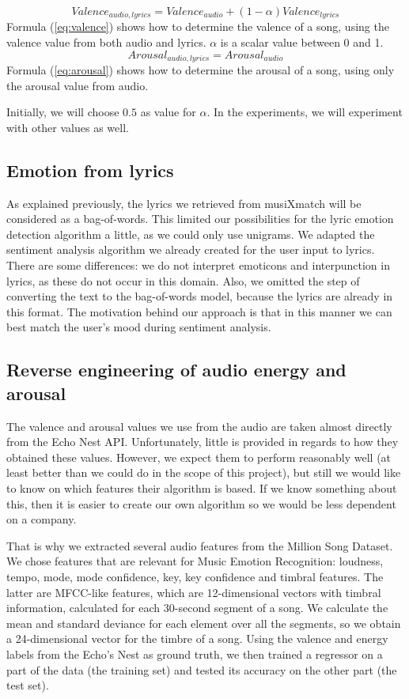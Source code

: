 \documentclass[10pt,journal,compsoc]{IEEEtran}
\begin{document}
\begin{equation}
Valence_{audio, lyrics} =  Valence_{audio} + (1 - \alpha)Valence_{lyrics}
\label{eq:valence}
\end{equation}
Formula (\ref{eq:valence}) shows how to determine the valence of a song, using the valence value from both audio and lyrics. $\alpha$ is a scalar value between 0 and 1.
\begin{equation}
Arousal_{audio, lyrics} =  Arousal_{audio}
\label{eq:arousal}
\end{equation}
Formula (\ref{eq:arousal}) shows how to determine the arousal of a song, using only the arousal value from audio.

Initially, we will choose $0.5$ as value for $\alpha$. In the experiments, we will experiment with other values as well.


\subsection{Emotion from lyrics}
	As explained previously, the lyrics we retrieved from musiXmatch will be considered as a bag-of-words. This limited our possibilities for the lyric emotion detection algorithm a little, as we could only use unigrams. We adapted the sentiment analysis algorithm we already created for the user input to lyrics. There are some differences: we do not interpret emoticons and interpunction in lyrics, as these do not occur in this domain. Also, we omitted the step of converting the text to the bag-of-words model, because the lyrics are already in this format. The motivation behind our approach is that in this manner we can best match the user's mood during sentiment analysis.
	
	\subsection{Reverse engineering of audio energy and arousal}
	The valence and arousal values we use from the audio are taken almost directly from the Echo Nest API. Unfortunately, little is provided in regards to how they obtained these values. However, we expect them to perform reasonably well (at least better than we could do in the scope of this project), but still we would like to know on which features their algorithm is based. If we know something about this, then it is easier to create our own algorithm so we would be less dependent on a company.
	
	That is why we extracted several audio features from the Million Song Dataset. We chose features that are relevant for Music Emotion Recognition: loudness, tempo, mode, mode confidence, key, key confidence and timbral features. The latter are MFCC-like features, which are 12-dimensional vectors with timbral information, calculated for each 30-second segment of a song. We calculate the mean and standard deviance for each element over all the segments, so we obtain a 24-dimensional vector for the timbre of a song. Using the valence and energy labels from the Echo's Nest as ground truth, we then trained a regressor on a part of the data (the training set) and tested its accuracy on the other part (the test set).
	
\end{document}

